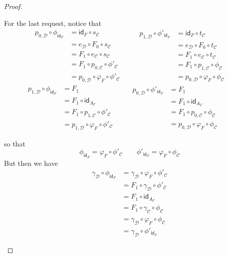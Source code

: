\documentclass[a4paper,UKenglish,cleveref,pdftex,thm-restate,numberwithinsect]{lipics-v2021}
\newcommand{\id}[1]{\mathsf{id}_{#1}}
\begin{document}
\begin{proof}
\begin{enumerate}
\begin{itemize}
				For the last request, notice that
				\[\begin{split}
					p_{0, \mathcal{D}} \circ \phi_{\id{F}}&= \id{F}\circ s_{\mathcal{C}}\\&= e_{\mathcal{D}}\circ F_0\circ s_{\mathcal{C}}\\&=F_1\circ e_{\mathcal{C}}\circ s_{\mathcal{C}}
					\\&= F_1\circ p_{0, \mathcal{C}}\circ \phi'_{\mathcal{C}}
					\\&=p_{0, \mathcal{D}}\circ \varphi_F\circ \phi'_{\mathcal{C}}
				\end{split}\qquad \begin{split}
				p_{1, \mathcal{D}} \circ \phi'_{\id{F}}&= \id{F}\circ t_{\mathcal{C}}\\&= e_{\mathcal{D}}\circ F_0\circ t_{\mathcal{C}}\\&=F_1\circ e_{\mathcal{C}}\circ t_{\mathcal{C}}
				\\&= F_1\circ p_{1, \mathcal{C}}\circ \phi_{\mathcal{C}}
				\\&=p_{0, \mathcal{D}}\circ \varphi_F\circ \phi_{\mathcal{C}}
				\end{split}\]
					\[\begin{split}
						p_{1, \mathcal{D}} \circ \phi_{\id{F}}&= F_1\\&=F_1\circ \id{A_{\mathcal{C}}}
						\\&= F_1\circ p_{1, \mathcal{C}}\circ \phi'_{\mathcal{C}}
						\\&=p_{1, \mathcal{D}}\circ \varphi_F\circ \phi'_{\mathcal{C}}
					\end{split}\qquad \begin{split}
					p_{0, \mathcal{D}} \circ \phi'_{\id{F}}&= F_1\\&= F_1 \circ \id{A_{\mathcal{C}}}
					\\&= F_1\circ p_{0, \mathcal{C}}\circ \phi_{\mathcal{C}}
					\\&=p_{0, \mathcal{D}}\circ \varphi_F\circ \phi_{\mathcal{C}}
				\end{split}\qquad \]
				
				so that
				\[\phi_{\id{F}} = \varphi_F \circ \phi'_{\mathcal{C} }\qquad \phi'_{\id{F}} = \varphi_F \circ \phi_{\mathcal{C}}  \]
				But then we have
				\begin{align*}
					\gamma_{\mathcal{D}}\circ \phi_{\id{F}} & = \gamma_{\mathcal{D}}\circ  \varphi_F \circ \phi'_{\mathcal{C} }\\&=F_1\circ \gamma_{\mathcal{D}}\circ \phi'_{\mathcal{C}}\\&=F_1\circ \id{A_{\mathcal{C}}}\\&=F_1\circ \gamma_{\mathcal{C}}\circ \phi_{\mathcal{C}}\\&= \gamma_{\mathcal{D}}\circ \varphi_{F}\circ \phi_{\mathcal{C}}\\&=\gamma_{\mathcal{D}}\circ \phi'_{\id{F}}
				\end{align*}
				

\end{itemize}
\end{enumerate}
\end{proof}
\end{document}
